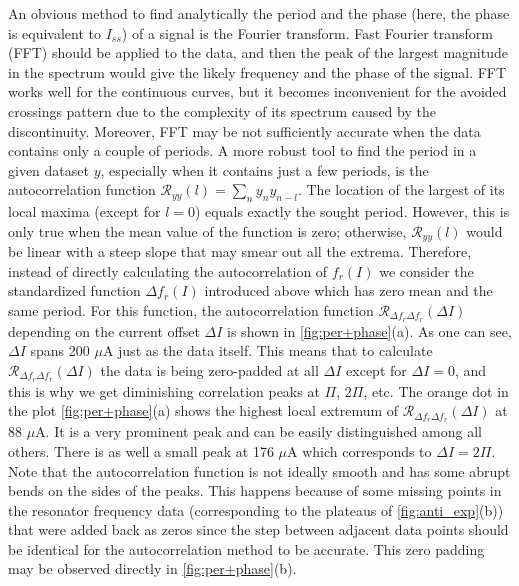 \documentclass[%
 aip,
 amsmath,amssymb,
 reprint,%
]{revtex4-1}
\begin{document}
An obvious method to find analytically the period and the phase (here, the phase is equivalent to $I_{ss}$) of a signal is the Fourier transform. Fast Fourier transform (FFT) should be applied to the data, and then the peak of the largest magnitude in the spectrum would give the likely frequency and the phase of the signal. FFT works well for the continuous curves, but it becomes inconvenient for the avoided crossings pattern due to the complexity of its spectrum caused by the discontinuity. Moreover, FFT may be not sufficiently accurate when the data contains only a couple of periods. A more robust tool to find the period in a given dataset $y$, especially when it contains just a few periods, is the autocorrelation function $\mathcal{R}_{y y}(l) = \sum_n y_n y_{n-l}$. The location of the largest of its local maxima (except for $l=0$) equals exactly the sought period\cite{parthasarathy2006}. However, this is only true when the mean value of the function is zero; otherwise, $\mathcal{R}_{y y}(l)$ would be linear with a steep slope that may smear out all the extrema. Therefore, instead of directly calculating the autocorrelation of $f_r (I)$ we consider the standardized function $\Delta f_r (I)$ introduced above which has zero mean and the same period. For this function, the autocorrelation function $\mathcal{R}_{\Delta f_r \Delta f_r}(\Delta I)$ depending on the current offset $\Delta I$ is shown in \autoref{fig:per+phase}(a). As one can see, $\Delta I$ spans 200 $\mu$A just as the data itself. This means that to calculate $\mathcal{R}_{\Delta f_r \Delta f_r}(\Delta I)$ the data is being zero-padded at all $\Delta I$ except for $\Delta I = 0$, and this is why we get diminishing correlation peaks at $\Pi$, $2\Pi$, etc. The orange dot in the plot \autoref{fig:per+phase}(a) shows the highest local extremum of $\mathcal{R}_{\Delta f_r \Delta f_r}(\Delta I)$ at 88 $\mu$A. It is a very prominent peak and can be easily distinguished among all others. There is as well a small peak at 176 $\mu$A which corresponds to $\Delta I = 2\Pi$. Note that the autocorrelation function is not ideally smooth and has some abrupt bends on the sides of the peaks. This happens because of some missing points in the resonator frequency data (corresponding to the plateaus of \autoref{fig:anti_exp}(b)) that were added back as zeros since the step between adjacent data points should be identical for the autocorrelation method to be accurate. This zero padding may be observed directly in \autoref{fig:per+phase}(b).
\end{document}
